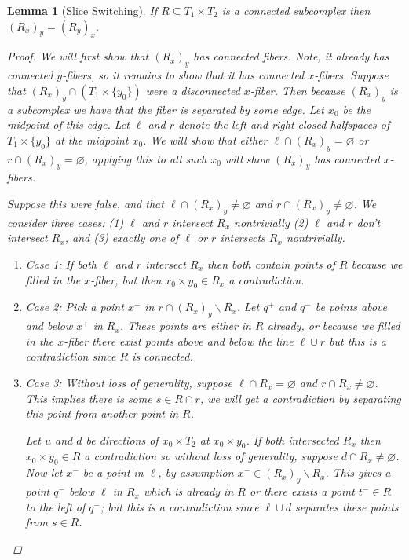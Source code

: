 \documentclass{article}
\newcommand{\rxy}{(R_x)_y}
\theoremstyle{mystyle}
\newtheorem{lem}[thm]{Lemma}
\theoremstyle{remark}
\begin{document}
\begin{lem}
    [Slice Switching]
    If \(R \subseteq T_{1} \times T_{2}\) is a connected subcomplex then \( \left( R_{x} \right)_{y} = \left( R_{y} \right)_{x}\).
    \begin{proof}
        We will first show that \(\rxy\) has connected fibers. Note, it already has connected \(y\)-fibers, so it remains to show that it has connected \(x\)-fibers. Suppose that \(\rxy \cap ( T_{1} \times \{y_{0}\} )\) were a disconnected \(x\)-fiber. Then because \(\rxy\) is a subcomplex we have that the fiber is separated by some edge. Let \(x_{0}\) be the midpoint of this edge. Let \(\ell\) and \(r\) denote the left and right closed halfspaces of \(T_{1} \times \{y_{0}\}\) at the midpoint \(x_{0}\). We will show that either \(\ell \cap \rxy = \varnothing\) or \(r \cap \rxy = \varnothing\), applying this to all such \(x_{0}\) will show \(\rxy\) has connected \(x\)-fibers.
        
        Suppose this were false, and that \(\ell \cap \rxy \neq \varnothing\) and \(r \cap \rxy \neq \varnothing\). We consider three cases: (1) \(\ell\) and \(r\) intersect \(R_{x}\) nontrivially (2) \(\ell\) and \(r\) don't intersect \(R_{x}\), and (3) exactly one of \(\ell\) or \(r\) intersects \(R_{x}\) nontrivially.
        \begin{enumerate}
            \item Case 1: If both \(\ell\) and \(r\) intersect \(R_{x}\) then both contain points of \(R\) because we filled in the \(x\)-fiber, but then \(x_{0} \times y_{0}  \in R_{x}\) a contradiction.
            \item Case 2: Pick a point \(x^+\) in \(r \cap \rxy \smallsetminus R_{x} \). Let \(q^{+}\) and \(q^-\) be points above and below \(x^+\) in \(R_{x}\). These points are either in \(R\) already, or because we filled in the \(x\)-fiber there exist points above and below the line \(\ell \cup r\) but this is a contradiction since \(R\) is connected.
            \item Case 3: Without loss of generality, suppose \(\ell \cap R_{x} = \varnothing\) and \(r \cap R_{x} \neq \varnothing\). This implies there is some \(s \in R \cap r\), we will get a contradiction by separating this point from another point in \(R\). 
                
                Let \(u\) and \(d\) be directions of \(x_{0} \times T_{2}\) at \(x_{0} \times y_{0}\). If both intersected \(R_{x}\) then \(x_{0} \times y_{0} \in R \) a contradiction so without loss of generality, suppose \(d \cap R_{x} \neq \varnothing \). Now let \(x^-\) be a point in \(\ell\), by assumption \(x^- \in \rxy \smallsetminus R_{x} \). This gives a point \(q^-\) below \(\ell\) in \(R_{x}\) which is already in \(R\) or there exists a point \(t^- \in R\) to the left of \(q^-\); but this is a contradiction since \(\ell \cup d\) separates these points from \(s \in R\).
        \end{enumerate}


\end{proof}
\end{lem}
\end{document}
